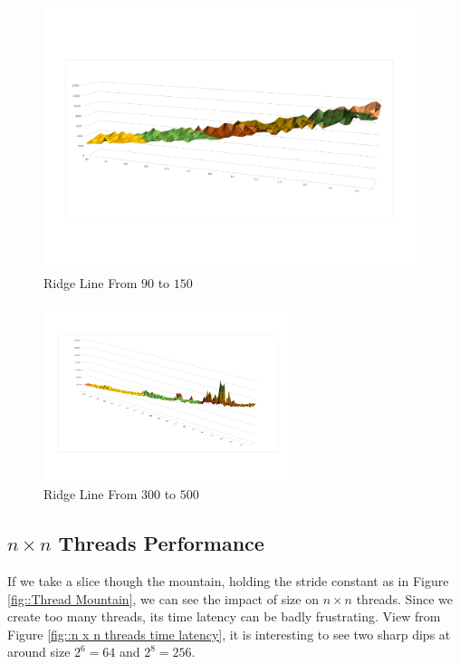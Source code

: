 \documentclass[12pt,a4paper]{article}
\begin{document}
\begin{minipage}{0.5\textwidth}
	\begin{figure}[H]
		\centering
		\includegraphics[width=0.97\textwidth]{./fig/ridge_1.pdf}
		\caption{Ridge Line From $90$ to $150$}
		\label{fig::ridge line of 90-150}
	\end{figure}
\end{minipage}
\begin{minipage}{0.5\textwidth}
	\begin{figure}[H]
		\centering
		\includegraphics[width=0.65\textwidth]{./fig/ridge_2.pdf}
		\caption{Ridge Line From $300$ to $500$}
		\label{fig::ridge line of 300-500}
	\end{figure}
\end{minipage}

\subsection{$n \times n $ Threads Performance}
If we take a slice though the mountain, holding the stride constant as in Figure \ref{fig::Thread Mountain}, we can see the impact of size on $n\times n $ threads. Since we create too many threads, its time latency can be badly frustrating. View from Figure \ref{fig::n x n threads time latency}, it is interesting to see two sharp dips at around size $2^6=64$ and $2^8=256$.
\end{document}
